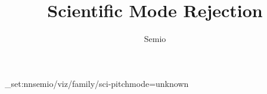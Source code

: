 \documentclass[type=paper,language=de,theme=dark]{semio}
\title{Scientific Mode Rejection}
\author{Semio}
\date{}
\begin{document}
\SemioVizProbePage
\ExplSyntaxOn\keys_set:nn{semio/viz/family/sci-pitch}{mode=unknown}\ExplSyntaxOff
{}
\SemioVizProbeEnd
\end{document}
